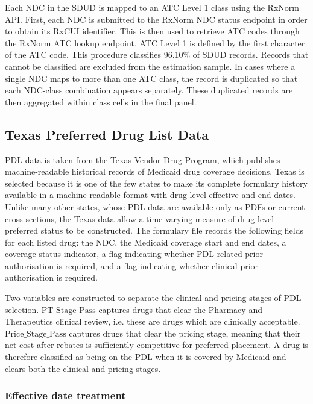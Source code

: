 \documentclass[12pt]{article}
\begin{document}
Each NDC in the SDUD is mapped to an ATC Level 1 class using the RxNorm API. First, each NDC is submitted to the RxNorm NDC status endpoint in order to obtain its RxCUI identifier. This is then used to retrieve ATC codes through the RxNorm ATC lookup endpoint. ATC Level 1 is defined by the first character of the ATC code. This procedure classifies 96.10\% of SDUD records. Records that cannot be classified are excluded from the estimation sample. In cases where a single NDC maps to more than one ATC class, the record is duplicated so that each NDC-class combination appears separately. These duplicated records are then aggregated within class cells in the final panel.

\subsection{Texas Preferred Drug List Data}

\label{sec:texas}

PDL data is taken from the Texas Vendor Drug Program, which publishes machine-readable historical records of Medicaid drug coverage decisions. Texas is selected because it is one of the few states to make its complete formulary history available in a machine-readable format with drug-level effective and end dates. Unlike many other states, whose PDL data are available only as PDFs or current cross-sections, the Texas data allow a time-varying measure of drug-level preferred status to be constructed. The formulary file records the following fields for each listed drug: the NDC, the Medicaid coverage start and end dates, a coverage status indicator, a flag indicating whether PDL-related prior authorisation is required, and a flag indicating whether clinical prior authorisation is required.

Two variables are constructed to separate the clinical and pricing stages of PDL selection. $\text{PT\_Stage\_Pass}$ captures drugs that clear the Pharmacy and Therapeutics clinical review, i.e. these are drugs which are clinically acceptable. $\text{Price\_Stage\_Pass}$ captures drugs that clear the pricing stage, meaning that their net cost after rebates is sufficiently competitive for preferred placement. A drug is therefore classified as being on the PDL when it is covered by Medicaid and clears both the clinical and pricing stages.

\subsubsection{Effective date treatment}
\end{document}
